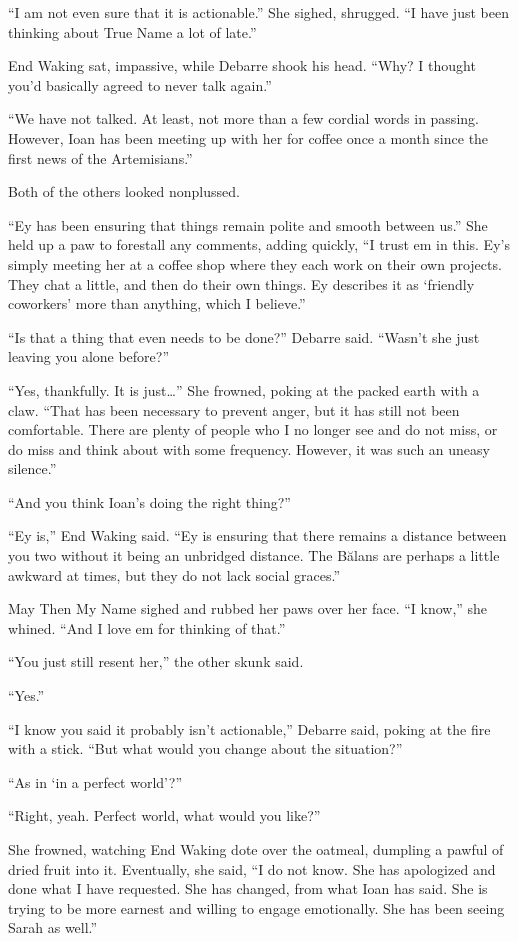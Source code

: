 ``I am not even sure that it is actionable.'' She sighed, shrugged. ``I have just been thinking about True Name a lot of late.''

End Waking sat, impassive, while Debarre shook his head. ``Why? I thought you'd basically agreed to never talk again.''

``We have not talked. At least, not more than a few cordial words in passing. However, Ioan has been meeting up with her for coffee once a month since the first news of the Artemisians.''

Both of the others looked nonplussed.

``Ey has been ensuring that things remain polite and smooth between us.'' She held up a paw to forestall any comments, adding quickly, ``I trust em in this. Ey's simply meeting her at a coffee shop where they each work on their own projects. They chat a little, and then do their own things. Ey describes it as `friendly coworkers' more than anything, which I believe.''

``Is that a thing that even needs to be done?'' Debarre said. ``Wasn't she just leaving you alone before?''

``Yes, thankfully. It is just\ldots{}'' She frowned, poking at the packed earth with a claw. ``That has been necessary to prevent anger, but it has still not been comfortable. There are plenty of people who I no longer see and do not miss, or do miss and think about with some frequency. However, it was such an uneasy silence.''

``And you think Ioan's doing the right thing?''

``Ey is,'' End Waking said. ``Ey is ensuring that there remains a distance between you two without it being an unbridged distance. The Bălans are perhaps a little awkward at times, but they do not lack social graces.''

May Then My Name sighed and rubbed her paws over her face. ``I know,'' she whined. ``And I love em for thinking of that.''

``You just still resent her,'' the other skunk said.

``Yes.''

``I know you said it probably isn't actionable,'' Debarre said, poking at the fire with a stick. ``But what would you change about the situation?''

``As in `in a perfect world'?''

``Right, yeah. Perfect world, what would you like?''

She frowned, watching End Waking dote over the oatmeal, dumpling a pawful of dried fruit into it. Eventually, she said, ``I do not know. She has apologized and done what I have requested. She has changed, from what Ioan has said. She is trying to be more earnest and willing to engage emotionally. She has been seeing Sarah as well.''

